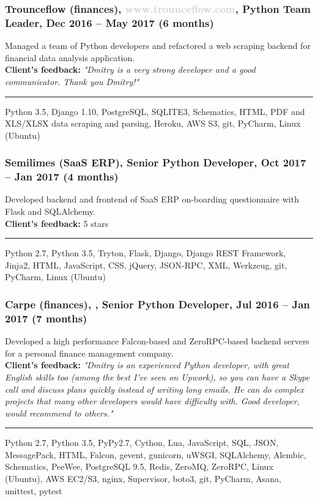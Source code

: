 \documentclass[a4paper,8pt]{extarticle}
\newcommand{\chref}[2]{\href{#1}{\underline{\smash{#2}}}}  %
\newcommand{\itchref}[2]{\chref{#1}{\textit{#2}}}  %
\newcommand{\chrule}{\vspace{3pt}\hrule}
\begin{document}
\subsubsection*{Trounceflow (finances), \textcolor{lightgray}{www.trounceflow.com}, Python Team Leader, Dec 2016 -- May 2017 (6 months)}
Managed a team of Python developers and refactored a web scraping backend for financial data analysis application.\\
\textbf{Client's feedback:} \textit{"Dmitry is a very strong developer and a good communicator. Thank you Dmitry!"}
\chrule
Python 3.5, Django 1.10, PostgreSQL, SQLITE3, Schematics, HTML, PDF and XLS/XLSX data scraping and parsing, Heroku, AWS S3, git, PyCharm, Linux (Ubuntu)

\subsubsection*{Semilimes (SaaS ERP), Senior Python Developer, Oct 2017 -- Jan 2017 (4 months)}
Developed backend and frontend of SaaS ERP on-boarding questionnaire with Flask and SQLAlchemy.\\
\textbf{Client's feedback:} 5 stars
\chrule
Python 2.7, Python 3.5, Tryton, Flask, Django, Django REST Framework, Jinja2, HTML, JavaScript, CSS, jQuery, JSON-RPC, XML, Werkzeug, git, PyCharm, Linux (Ubuntu)

\subsubsection*{Carpe (finances), \itchref{https://www.carpe.com}{www.carpe.com}, Senior Python Developer, Jul 2016 -- Jan 2017 (7 months)}
Developed a high performance Falcon-based and ZeroRPC-based backend servers for a personal finance management company.\\
\textbf{Client's feedback:} \textit{"Dmitry is an experienced Python developer, with great English skills too (among the best I've seen on Upwork), so you can have a Skype call and discuss plans quickly instead of writing long emails. He can do complex projects that many other developers would have difficulty with. Good developer, would recommend to others."}
\chrule
Python 2.7, Python 3.5, PyPy2.7, Cython, Lua, JavaScript, SQL, JSON, MessagePack, HTML, Falcon, gevent, gunicorn, uWSGI, SQLAlchemy, Alembic, Schematics, PeeWee, PostgreSQL 9.5, Redis, ZeroMQ, ZeroRPC, Linux (Ubuntu), AWS EC2/S3, nginx, Supervisor, boto3, git, PyCharm, Asana, unittest, pytest
\end{document}
